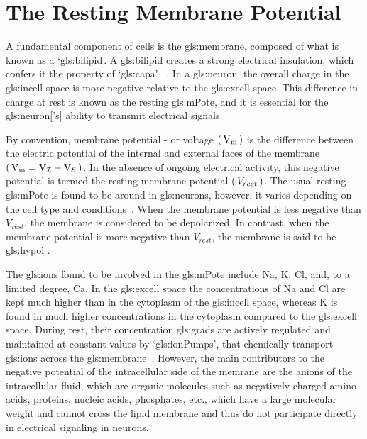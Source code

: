 \documentclass[class={myRUCProject}, crop=false]{standalone}
\begin{document}
\section{The Resting Membrane Potential} 
A fundamental component of cells is the \gls{gls:membrane}, composed of what is known as a `\gls{gls:bilipid}'\footnotemark. A \gls{gls:bilipid} creates a strong electrical insulation, 
which confers it the property of `\gls{gls:capa}'~\cite{}
. 
In a \gls{gls:neuron}, the overall charge in the \gls{gls:incell} space is more negative relative to the \gls{gls:excell} space. This difference in charge at rest is known as the resting \gls{gls:mPote}, and it is essential for the \gls{gls:neuron}['s] ability to transmit electrical signals. 

By convention, membrane potential - or voltage \(\br{\unit{\V\membrane}}\) is the difference between the electric potential of the internal and external faces of the membrane \(\br{\unit{\V\membrane}=\unit{\V\incell}-\unit{\V\excell}}\). In the absence of ongoing electrical activity, this negative potential is termed the resting membrane potential \(\left(\,V_{rest}\,\right)\). The usual resting \gls{gls:mPote} is found to be around  in \glspl{gls:neuron}, however, it varies depending on the cell type and conditions~\cite{}. When the membrane potential is less negative than \(V_{rest}\), the membrane is considered to be depolarized. In contrast, when the membrane potential is more negative than \(V_{rest}\), the membrane is said to be \gls{gls:hypol} \cite{Hammond2015ch3}. 

The \glspl{gls:ion} found to be involved in the \gls{gls:mPote} include \gls{Na}, \gls{K}, \gls{Cl}, and, to a limited degree, \gls{Ca}. 
In the \gls{gls:excell} space the concentrations of \gls{Na} and \gls{Cl} are kept much higher than in the cytoplasm of the \gls{gls:incell} space, whereas \gls{K} is found in much higher concentrations in the cytoplasm compared to the \gls{gls:excell} space. During rest, their concentration \glspl{gls:grad} are actively regulated and maintained at constant values by `\glspl{gls:ionPump}', that chemically transport \glspl{gls:ion} across the \gls{gls:membrane}~\cite{}. However, the main contributors to the negative potential of the intracellular side of the memrane are the anions of the intracellular fluid, which are organic molecules such as negatively charged amino acids, proteins, nucleic acids, phosphates, etc., which have a large molecular weight and cannot cross the lipid membrane and thus do not participate directly in electrical signaling in neurons\cite{Hammond2015ch3}. 
\end{document}
